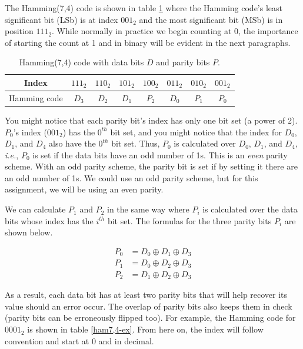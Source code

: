 \documentclass[11pt]{article}
\begin{document}
The Hamming(7,4) code is shown in table \ref{ham7,4} where the Hamming code's least significant bit (LSb)
is at index $001_2$ and the most significant bit (MSb) is in position $111_2$. While normally in practice
we begin counting at 0, the importance of starting the count at 1 and in binary will
be evident in the next paragraphs.
\begin{table}[h]
    \centering
\begin{tabular}{ |c|c|c|c|c|c|c|c| } 
 \hline
 Index & $111_2$ & $110_2$ & $101_2$ & $100_2$ & $011_2$ & $010_2$ & $001_2$ \\
 \hline \hline
 Hamming code & $D_3$ & $D_2$ & $D_1$ & $P_2$ & $D_0$ & $P_1$ & $P_0$ \\
 \hline
\end{tabular}
    \caption{Hamming(7,4) code with data bits $D$ and parity bits $P$.} 
    \label{ham7,4}
\end{table}


You might notice that each parity bit's index has only one bit set (a power of 2). $P_0$'s index ($001_2$) has the
$0^{th}$ bit set, and you might notice that the index for $D_0$, $D_1$, and $D_4$ also have the $0^{th}$ bit set.
Thus, $P_0$ is calculated over $D_0$, $D_1$, and $D_4$, \textit{i.e.}, $P_0$ is set if the data bits have an
odd number of 1s. This is an \emph{even} parity scheme. With an odd parity scheme, the parity bit is set if
by setting it there are an odd number of 1s. We could use an odd parity scheme, but for this
assignment, we will be using an even parity. 

We can calculate $P_1$ and $P_2$ in the same way where $P_i$ is calculated over the data bits whose 
index has the $i^{th}$ bit set. The formulas for the three parity bits $P_i$ are shown below.

\begin{equation*}
\begin{split}
    P_0 &= D_0 \oplus D_1 \oplus D_3 \\
    P_1 &= D_0 \oplus D_2 \oplus D_3 \\
    P_2 &= D_1 \oplus D_2 \oplus D_3
\end{split}
\end{equation*}

\noindent As a result, each data bit has at least two parity bits that will help recover its value
should an error occur. The overlap of parity bits also keeps them in check (parity bits can be
erroneously flipped too). For example, the Hamming code for $0001_2$ is shown in table \ref{ham7,4-ex}.
From here on, the index will follow convention and start at 0 and in decimal.
\end{document}
